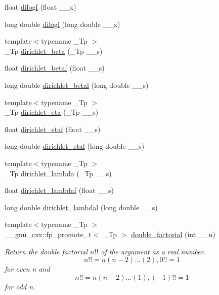 \begin{DoxyCompactItemize}
\item 
float \hyperlink{group__mathsf__gnu_ga901091e0e7ce7d6113ae6a86f4865a92}{dilogf} (float \+\_\+\+\_\+x)
\item 
long double \hyperlink{group__mathsf__gnu_gae90c13ee690ebaf10a18a900fe2646f9}{dilogl} (long double \+\_\+\+\_\+x)
\item 
{\footnotesize template$<$typename \+\_\+\+Tp $>$ }\\\+\_\+\+Tp \hyperlink{group__mathsf__gnu_ga87466a2d429a2815d794acc21c882b08}{dirichlet\+\_\+beta} (\+\_\+\+Tp \+\_\+\+\_\+s)
\item 
float \hyperlink{group__mathsf__gnu_ga9bb40e20b18e3eb822e70af955940830}{dirichlet\+\_\+betaf} (float \+\_\+\+\_\+s)
\item 
long double \hyperlink{group__mathsf__gnu_gaed6fd85a4577f4de66d74742a1850a13}{dirichlet\+\_\+betal} (long double \+\_\+\+\_\+s)
\item 
{\footnotesize template$<$typename \+\_\+\+Tp $>$ }\\\+\_\+\+Tp \hyperlink{group__mathsf__gnu_gae46e26e4107675d285c79a2d6202e6c7}{dirichlet\+\_\+eta} (\+\_\+\+Tp \+\_\+\+\_\+s)
\item 
float \hyperlink{group__mathsf__gnu_ga6f05d076600b1de9193e586cf89547c9}{dirichlet\+\_\+etaf} (float \+\_\+\+\_\+s)
\item 
long double \hyperlink{group__mathsf__gnu_ga408e2267b648f29445522dbafb7a0e1a}{dirichlet\+\_\+etal} (long double \+\_\+\+\_\+s)
\item 
{\footnotesize template$<$typename \+\_\+\+Tp $>$ }\\\+\_\+\+Tp \hyperlink{group__mathsf__gnu_ga06842a81bdcabf9c62252dde992d42ee}{dirichlet\+\_\+lambda} (\+\_\+\+Tp \+\_\+\+\_\+s)
\item 
float \hyperlink{group__mathsf__gnu_gaafd3ca6b0d71d55d3835536396eece8f}{dirichlet\+\_\+lambdaf} (float \+\_\+\+\_\+s)
\item 
long double \hyperlink{group__mathsf__gnu_gab28d06c4e3c7457f1fa3663168678fb2}{dirichlet\+\_\+lambdal} (long double \+\_\+\+\_\+s)
\item 
{\footnotesize template$<$typename \+\_\+\+Tp $>$ }\\\+\_\+\+\_\+gnu\+\_\+cxx\+::fp\+\_\+promote\+\_\+t$<$ \+\_\+\+Tp $>$ \hyperlink{group__mathsf__gnu_ga1e62c47f84f9782828f8830b4fedc13c}{double\+\_\+factorial} (int \+\_\+\+\_\+n)
\begin{DoxyCompactList}\small\item\em Return the double factorial $ n!! $ of the argument as a real number. \[ n!! = n(n-2)...(2), 0!! = 1 \] for even {\ttfamily n} and \[ n!! = n(n-2)...(1), (-1)!! = 1 \] for odd {\ttfamily n}. \end{DoxyCompactList}\item 

\end{DoxyCompactItemize}
